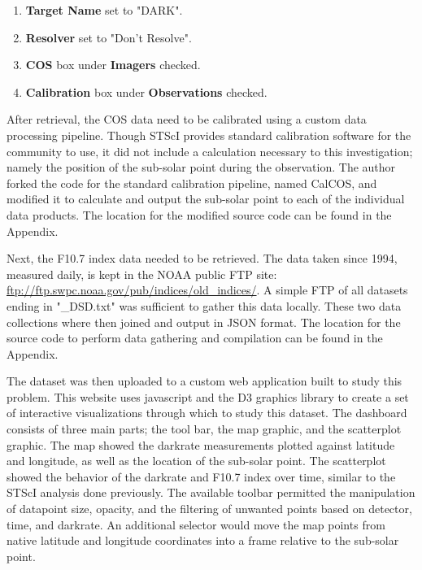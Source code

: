 \documentclass[a4paper,11pt]{article}
\begin{document}
\begin{enumerate}
	\item {\bf Target Name} set to "DARK".
	\item {\bf Resolver} set to "Don't Resolve".
	\item {\bf COS} box under {\bf Imagers} checked.
	\item {\bf Calibration} box under {\bf Observations} checked.
\end{enumerate}

After retrieval, the COS data need to be calibrated using a custom data processing pipeline.  Though
STScI provides standard calibration software for the community to use, it did not include a calculation
necessary to this investigation; namely the position of the sub-solar point during the observation.  The author 
forked the code for the standard calibration
pipeline, named CalCOS, and modified it to calculate and output the sub-solar point to each of the 
individual data products.  The location for the modified source code can be found in the Appendix.

Next, the F10.7 index data needed to be retrieved.  The data taken since 1994, 
measured daily, is kept in the NOAA public FTP site:
 \href{ftp://ftp.swpc.noaa.gov/pub/indices/old\_indices/}{ftp://ftp.swpc.noaa.gov/pub/indices/old\_indices/}.  A simple FTP of all 
 datasets ending in "\_DSD.txt" was sufficient to gather this data locally. These two data collections where then joined and output in JSON format. The location for the source code to perform data gathering and compilation can be found in the Appendix. 
 
The dataset was then uploaded to a custom web application
built to study this problem.  This website uses javascript and the D3 graphics library to create a set of interactive 
visualizations through which to study this dataset.  The dashboard consists of three main parts; the 
tool bar, the map graphic, and the scatterplot graphic.  The map showed the darkrate measurements plotted against
latitude and longitude, as well as the location of the sub-solar point.  The scatterplot showed the behavior of the 
darkrate and F10.7 index over time, similar to the STScI analysis done previously.  The available toolbar permitted the
manipulation of datapoint size, opacity, and the filtering of unwanted points based on detector, time, and darkrate.  An additional selector would move the map points from native latitude and longitude coordinates into a frame relative to the sub-solar point.  
\end{document}
